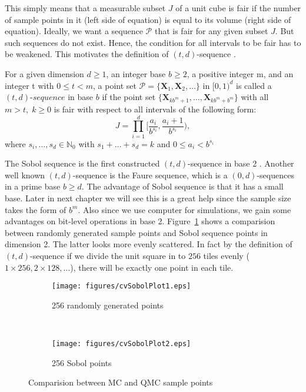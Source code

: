 This simply means that a measurable subset $J$ of a unit cube is fair if the number of sample points in it (left side of equation) is equal to its volume (right side of equation). 
Ideally, we want a sequence $\mathscr{P}$ that is fair for any given subset $J$. But such sequences do not exist. 
Hence, the condition for all intervals to be fair has to be weakened. This motivates the definition of $(t,d)$-sequence \cite{dick2010digital}. 
\theoremstyle{definition}
\begin{definition}{}
    For a given dimension $d \geq 1$, an integer base $b \geq 2$, a positive integer m, and an integer t with $0 \leq t < m$, a point set $\mathscr{P} =\{\mathbf{X}_1,\mathbf{X}_2,\dots\}$ in $[0, 1)^d$ is called a $\textit{$(t,d)$-sequence}$ in base $b$ 
if the point set $\{\mathbf{X}_{kb^m+1},\dots,\mathbf{X}_{kb^m+b^m}\}$ with all $m>t,\;k\geq 0$ is fair with respect to all intervals of the following form:
    \[
        J=\prod_{i=1}^{d}\Big[\frac{a_i}{b^{s_i}}, \frac{a_i+1}{b^{s_i}}\Big),
                    \]
                    where $s_i,\dots, s_d\in\mathbb{N}_0$ with $s_1+\dots+s_d=k$ and $0\leq a_i < b^{s_i}$  
\end{definition}

The Sobol sequence is the first constructed $(t,d)$-sequence in base 2 \cite{dick2010digital}. Another well known $(t,d)$-sequence is the Faure sequence, which is a $(0, d)$-sequences in a prime base $b \geq d$. 
The advantage of Sobol sequence is that it has a small base. 
Later in next chapter we will see this is a great help since the sample size takes the form of $b^m$. 
Also since we use computer for simulations, we gain some advantages on bit-level operations in base 2.
Figure~\ref{fg:sobol} shows a comparision between randomly generated sample points and Sobol sequence points in dimension 2. 
The latter looks more evenly scattered. 
In fact by the definition of $(t,d)$-sequence if we divide the unit square in to $256$ tiles evenly ($1\times256, 2\times128,\dots$), there will be exactly one point in each tile.  

\begin{figure}
    \centering
    \begin{subfigure}[b]{.5\textwidth}
    \texttt{[image: figures/cvSobolPlot1.eps]}
    \caption{256 randomly generated points}
    \end{subfigure}~\begin{subfigure}[b]{.5\textwidth}
    \texttt{[image: figures/cvSobolPlot2.eps]}
    \caption{256 Sobol points}
    \end{subfigure}
    \caption{Comparision between MC and QMC sample points}\label{fg:sobol}
\end{figure}

